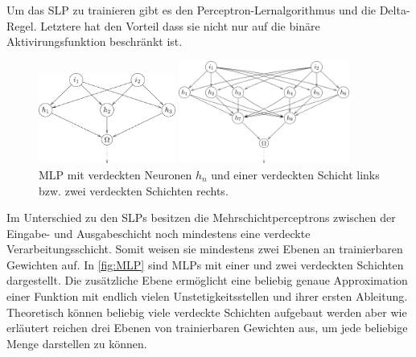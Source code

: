 Um das SLP zu trainieren gibt es den Perceptron-Lernalgorithmus und die Delta-Regel. Letztere hat den Vorteil dass sie nicht nur auf die binäre Aktivirungsfunktion beschränkt ist.
\\

\begin{figure}[!htb]
  \parbox[b]{.5\linewidth}{
  \centering
    \includegraphics[width=0.4\textwidth]{Bilder/MLP/mlp_1h.png}
  
  
  }%
\parbox[b]{.5\linewidth}{%
        \includegraphics[width=0.5\textwidth]{Bilder/MLP/mlp_2h.png}

}

  
    \caption{MLP mit verdeckten Neuronen $h_n$ und einer verdeckten Schicht links bzw. zwei verdeckten Schichten rechts.}
    \label{fig:MLP}
\end{figure}

Im Unterschied zu den SLPs besitzen die Mehrschichtperceptrons zwischen der Eingabe- und Ausgabeschicht noch mindestens eine verdeckte Verarbeitungsschicht. Somit weisen sie mindestens zwei Ebenen an trainierbaren Gewichten auf. In \autoref{fig:MLP} sind MLPs mit einer und zwei verdeckten Schichten dargestellt. Die zusätzliche Ebene ermöglicht eine beliebig genaue Approximation einer Funktion mit endlich vielen Unstetigkeitsstellen und ihrer ersten Ableitung. Theoretisch können beliebig viele verdeckte Schichten aufgebaut werden aber wie \hbox{\citet{dkriesel07}} erläutert reichen drei Ebenen von trainierbaren Gewichten aus, um jede beliebige Menge darstellen zu können.

